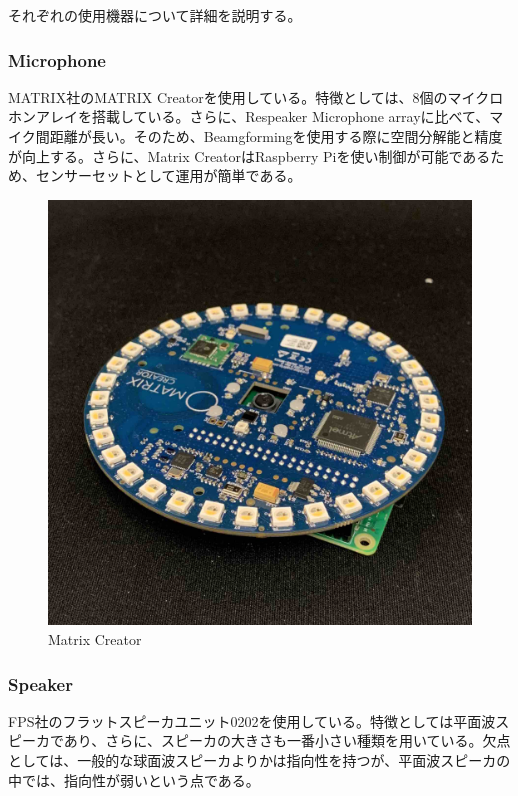\clearpage

それぞれの使用機器について詳細を説明する。
\subsubsection{Microphone}
MATRIX社のMATRIX Creatorを使用している。特徴としては、8個のマイクロホンアレイを搭載している。さらに、Respeaker Microphone arrayに比べて、マイク間距離が長い。そのため、Beamgformingを使用する際に空間分解能と精度が向上する。さらに、Matrix CreatorはRaspberry Piを使い制御が可能であるため、センサーセットとして運用が簡単である。

\begin{figure}[tb]
  \begin{center}
  \vspace{1zh}
    \includegraphics[width=0.7\linewidth]{images/5_matrix_creator.jpg}   
  \end{center}
  \caption{Matrix Creator}
  \label{fig:hand_hard_matrix}
\end{figure}

\subsubsection{Speaker}
FPS社のフラットスピーカユニット0202を使用している。特徴としては平面波スピーカであり、さらに、スピーカの大きさも一番小さい種類を用いている。欠点としては、一般的な球面波スピーカよりかは指向性を持つが、平面波スピーカの中では、指向性が弱いという点である。

